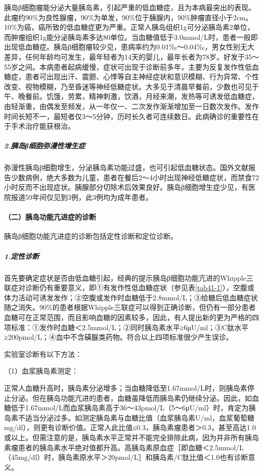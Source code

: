 胰岛β细胞瘤能分泌大量胰岛素，引起严重的低血糖症，且为本病最突出的表现。此瘤约90\%为良性腺瘤，90\%为单发，90\%位于胰腺内，90\%肿瘤直径小于2cm。10\%为癌，癌所致的低血糖症更为严重。正常人胰岛组织1g可分泌胰岛素2单位，而肿瘤组织1g能分泌胰岛素多达80单位。当血糖值低于3.0mmol/L时，患者一般即出现低血糖症。胰岛β细胞瘤较少见，患病率约为0.01‰～0.04‰，男女性别无大差异，任何年龄均可发生，最年轻者为14天的婴儿，最年长者为78岁。好发于35～55岁之间。本病患者起病缓慢，症状可出现于诊断前多年，主要为反复发作性低血糖症，患者可出现出汗、震颤、心悸等自主神经症状和意识模糊、行为异常、个性改变、视物模糊，乃至昏迷等神经低糖症状。大多见于清晨早餐前，少数也可见于午、晚餐前。饥饿，劳累，精神刺激，饮酒，月经来潮，发热等可诱发低血糖症，由轻渐重，由偶发至频发，从一年仅一、二次发作渐渐增加至一日数次发作。发作时间长短不一，最短者仅3～5分钟，历时长久者可连续数日。此病确诊的重要性在于手术治疗能获根治。

\subparagraph{2.胰岛β细胞弥漫性增生症}

弥漫性胰岛β细胞增生，分泌胰岛素功能过盛，也可引起低血糖状态。国外文献报告少数病例，绝大多数为儿童，患者在餐后2～4小时出现神经低糖症状，而禁食72小时反而不出现症状。胰腺部分切除术后效果良好。胰岛β细胞增生症少见，有医院报道59年间仅见到3例，此3例均为成年患者。

\paragraph{（二）胰岛功能亢进症的诊断}

胰岛β细胞功能亢进症的诊断包括定性诊断和定位诊断。

\subparagraph{1.定性诊断}

首先要确定症状是否由低血糖引起，经典的提示胰岛β细胞功能亢进的Whipple三联症对诊断仍有重要意义，即①有发作性低血糖症状（参见表\ref{tab41-1}），空腹或体力活动可诱发发作；②空腹或发作时血糖低于2.8mmol/L；③给糖后低血糖症状随之消失。90\%的患者根据Whipple三联症可以得到正确诊断，但仍有一部分患者血糖可在正常范围，而且影响血糖的因素较多，因此，有人提出新的更为严格的四项标准：①发作时血糖＜2.5mmol/L；②同时胰岛素水平≥6μU/ml；③C肽水平≥200pmol/L；④血中不含磺脲类药物。符合以上四项标准很少产生误诊。

实验室诊断有以下方法：

\hypertarget{text00318.htmlux5cux23CHP41-1-1-1-2-1-1}{}
（1）血浆胰岛素测定：

正常人血糖升高时，胰岛素分泌增多；当血糖降低至1.67mmol/L时，则胰岛素停止分泌。但在胰岛功能亢进的患者，血糖虽降低而胰岛素仍继续分泌。因此，如血糖低于1.67mmol/L而血浆胰岛素高于36～43pmol/L（5～6μU/ml）时，肯定为胰岛素不适当分泌过多。如测定胰岛素与血糖比值（血浆胰岛素U/ml，血浆葡萄糖mg/dl），则更有诊断价值。正常人此比值≤0.3，胰岛素瘤患者＞0.3，甚至高达1.0或以上。但需注意的是，胰岛素水平正常并不能完全排除此病，因为并非所有胰岛素瘤患者的胰岛素水平绝对值都升高。高胰岛素原血症［即血糖＜2.5mmol/L（45mg/dl）时，胰岛素原水平＞20pmol/L］和胰岛素/C肽比值＜1.0也有诊断意义。

